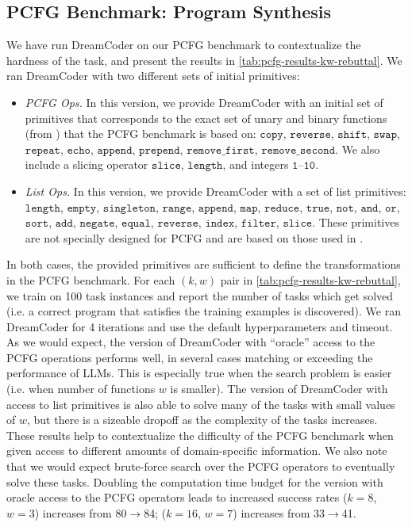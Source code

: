 \documentclass{article}
\renewcommand{\tt}[1]{{\texttt{#1}}}
\begin{document}
\subsection{PCFG Benchmark: Program Synthesis}
\label{app:pcfg-dreamcoder}
We have run DreamCoder \cite{ellis2021dreamcoder} on our PCFG benchmark to contextualize the hardness of the task, and present the results in \cref{tab:pcfg-results-kw-rebuttal}.
We ran DreamCoder with two different sets of initial primitives:
\begin{itemize}[leftmargin=*]
    \item
        \textit{PCFG Ops.}
        In this version, we provide DreamCoder with an initial set of primitives that corresponds to the exact set of unary and binary functions (from \cite{hupkes2020compositionality}) that the PCFG benchmark is based on:
        $\tt{copy}$,
        $\tt{reverse}$,
        $\tt{shift}$,
        $\tt{swap}$,
        $\tt{repeat}$,
        $\tt{echo}$,
        $\tt{append}$,
        $\tt{prepend}$,
        $\tt{remove\_first}$,
        $\tt{remove\_second}$.
        We also include a slicing operator $\texttt{slice}$, $\texttt{length}$, and integers $\tt{1}$--$\tt{10}$.
    \item
        \textit{List Ops.}
        In this version, we provide DreamCoder with a set of list primitives:
        $\tt{length}$,
        $\tt{empty}$,
        $\tt{singleton}$,
        $\tt{range}$,
        $\tt{append}$,
        $\tt{map}$,
        $\tt{reduce}$,
        $\tt{true}$,
        $\tt{not}$,
        $\tt{and}$,
        $\tt{or}$,
        $\tt{sort}$,
        $\tt{add}$,
        $\tt{negate}$,
        $\tt{equal}$,
        $\tt{reverse}$,
        $\tt{index}$,
        $\tt{filter}$,
        $\tt{slice}$. These primitives are not specially designed for PCFG and are based on those used in \cite{ellis2021dreamcoder,ellis2018learning}.
\end{itemize}
In both cases, the provided primitives are sufficient to define the transformations in the PCFG benchmark.
For each $(k, w)$ pair in \cref{tab:pcfg-results-kw-rebuttal}, we train on 100 task instances and report the number of tasks which get solved (i.e. a correct program that satisfies the training examples is discovered).
We ran DreamCoder for 4 iterations and use the default hyperparameters and timeout. As we would expect, the version of DreamCoder with ``oracle'' access to the PCFG operations performs well, in several cases matching or exceeding the performance of LLMs. This is especially true when the search problem is easier (i.e. when number of functions $w$ is smaller). The version of DreamCoder with access to list primitives is also able to solve many of the tasks with small values of $w$, but there is a sizeable dropoff as the complexity of the tasks increases. These results help to contextualize the difficulty of the PCFG benchmark when given access to different amounts of domain-specific information. We also note that we would expect brute-force search over the PCFG operators to eventually solve these tasks. Doubling the computation time budget for the version with oracle access to the PCFG operators leads to increased success rates ($k=8$, $w=3$) increases from 80$\rightarrow$84; ($k=16$, $w=7$) increases from 33$\rightarrow$41.
\end{document}
